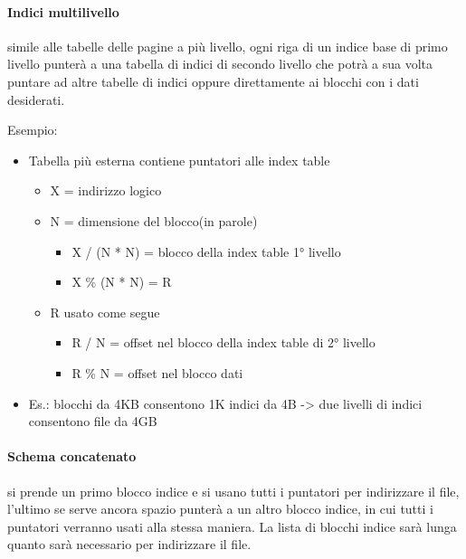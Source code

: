 \documentclass[a4paper, 12pt]{book}
\begin{document}
\paragraph{Indici multilivello} simile alle tabelle delle 
pagine a più livello, ogni riga di un indice base di primo 
livello punterà a una tabella di indici di secondo livello
che potrà a sua volta puntare ad altre tabelle di indici oppure 
direttamente ai blocchi con i dati desiderati.

Esempio:
\begin{itemize}
    \item Tabella più esterna contiene puntatori
    alle index table
    \begin{itemize}
        \item X = indirizzo logico  
        \item N = dimensione del blocco(in parole)
        \begin{itemize}
            \item X / (N * N) = blocco della index table 1° livello
            \item X \% (N * N) = R
        \end{itemize}
        \item R usato come segue
        \begin{itemize}
            \item R / N = offset nel blocco della index table 
            di 2° livello
            \item R \% N = offset nel blocco dati
        \end{itemize}
    \end{itemize}
    \item Es.: blocchi da 4KB consentono 1K indici da 4B 
        -> due livelli di indici consentono file da 4GB
\end{itemize}

\paragraph{Schema concatenato} si prende un primo blocco 
indice e si usano tutti i puntatori per indirizzare il 
file, l'ultimo se serve ancora spazio punterà a un altro 
blocco indice, in cui tutti i puntatori verranno usati 
alla stessa maniera. La lista di blocchi indice sarà lunga 
quanto sarà necessario per indirizzare il file.
\end{document}
